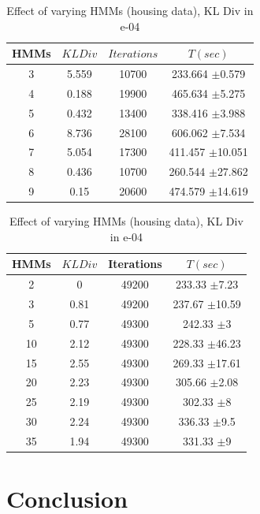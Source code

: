 \documentclass{acm_proc_article-sp}
\begin{document}
\begin{table}[htdp]
\parbox{.39\linewidth}{
\centering
\begin{tabular}{| c | c | c | c |}
\hline
HMMs & $KL Div$ & $Iterations$ & $T(sec)$  \\
\hline
3 & 5.559  & 10700 & 233.664 $\pm$0.579 \\
4 & 0.188 & 19900 & 465.634 $\pm$5.275  \\
5 & 0.432  & 13400 & 338.416 $\pm$3.988  \\
6 & 8.736  & 28100 & 606.062 $\pm$7.534 \\
7 & 5.054  & 17300 & 411.457 $\pm$10.051\\
8 & 0.436 & 10700 & 260.544 $\pm$27.862 \\
9 & 0.15 & 20600 & 474.579 $\pm$14.619 \\
\hline
\end{tabular}
\caption{Effect of varying HMMs (REDD)}
\label{table:hmm1}}
\hfill
\parbox{.65\linewidth}{
\centering
\begin{tabular}{| c | c | c | c |}
\hline
HMMs & $KL Div$ & Iterations & $T(sec)$\\
\hline
2 & 0 & 49200 & 233.33 $\pm$7.23 \\
3 & 0.81 & 49200 & 237.67 $\pm$10.59 \\
5 & 0.77 & 49300 & 242.33 $\pm$3 \\
10 & 2.12 & 49300 & 228.33 $\pm$46.23 \\
15 & 2.55 & 49300 & 269.33 $\pm$17.61 \\
20 & 2.23 & 49300 & 305.66 $\pm$2.08  \\
25 & 2.19 & 49300 & 302.33 $\pm$8 \\
30 & 2.24 & 49300 & 336.33 $\pm$9.5 \\
35 & 1.94 & 49300 & 331.33 $\pm$9 \\
\hline
\end{tabular}
\caption{Effect of varying HMMs (housing data), KL Div in e-04}
\label{table:hmm2}
}
\end{table}


\section{Conclusion}
\label{conclusion}
\end{document}
